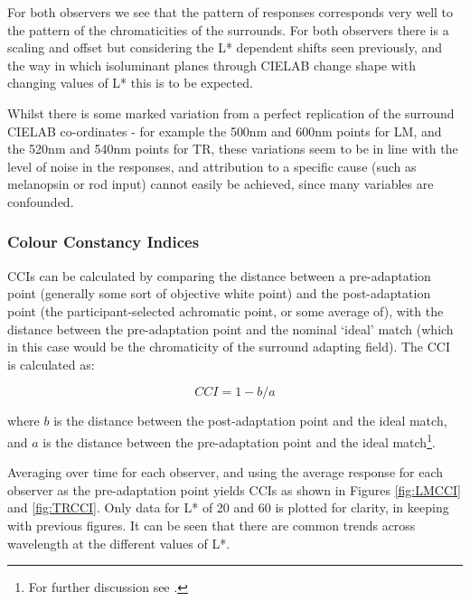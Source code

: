 For both observers we see that the pattern of responses corresponds very well to the pattern of the chromaticities of the surrounds. For both observers there is a scaling and offset but considering the L* dependent shifts seen previously, and the way in which isoluminant planes through CIELAB change shape with changing values of L* this is to be expected.

Whilst there is some marked variation from a perfect replication of the surround CIELAB co-ordinates - for example the 500nm and 600nm points for LM, and the 520nm and 540nm points for TR, these variations seem to be in line with the level of noise in the responses, and attribution to a specific cause (such as melanopsin or rod input) cannot easily be achieved, since many variables are confounded.


\subsubsection{Colour Constancy Indices}

\Glspl{CCI} can be calculated by comparing the distance between a pre-adaptation point (generally some sort of objective white point) and the post-adaptation point (the participant-selected achromatic point, or some average of), with the distance between the pre-adaptation point and the nominal `ideal' match (which in this case would be the chromaticity of the surround adapting field). The \gls{CCI} is calculated as:

\begin{equation}
CCI = 1-b/a
\label{eq:CCI}
\end{equation}

where $b$ is the distance between the post-adaptation point and the ideal match, and $a$ is the distance between the pre-adaptation point and the ideal match\footnote{For further discussion see \citet[Section 4.1, pg. 681]{foster_color_2011}.}.

Averaging over time for each observer, and using the average response for each observer as the pre-adaptation point yields \glspl{CCI} as shown in Figures \ref{fig:LMCCI} and \ref{fig:TRCCI}. Only data for L* of 20 and 60 is plotted for clarity, in keeping with previous figures. It can be seen that there are common trends across wavelength at the different values of L*.

